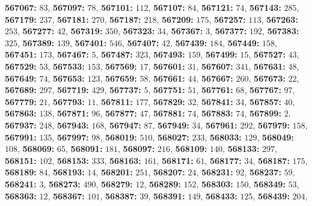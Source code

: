 \textsf{\bfseries 567067:} $83$, \textsf{\bfseries 567097:} $78$, \textsf{\bfseries 567101:} $112$, \textsf{\bfseries 567107:} $84$, \textsf{\bfseries 567121:} $74$, \textsf{\bfseries 567143:} $285$, \textsf{\bfseries 567179:} $237$, \textsf{\bfseries 567181:} $270$, \textsf{\bfseries 567187:} $218$, \textsf{\bfseries 567209:} $175$, \textsf{\bfseries 567257:} $113$, \textsf{\bfseries 567263:} $253$, \textsf{\bfseries 567277:} $42$, \textsf{\bfseries 567319:} $350$, \textsf{\bfseries 567323:} $34$, \textsf{\bfseries 567367:} $3$, \textsf{\bfseries 567377:} $192$, \textsf{\bfseries 567383:} $325$, \textsf{\bfseries 567389:} $139$, \textsf{\bfseries 567401:} $546$, \textsf{\bfseries 567407:} $42$, \textsf{\bfseries 567439:} $184$, \textsf{\bfseries 567449:} $158$, \textsf{\bfseries 567451:} $173$, \textsf{\bfseries 567467:} $5$, \textsf{\bfseries 567487:} $323$, \textsf{\bfseries 567493:} $159$, \textsf{\bfseries 567499:} $15$, \textsf{\bfseries 567527:} $43$, \textsf{\bfseries 567529:} $53$, \textsf{\bfseries 567533:} $153$, \textsf{\bfseries 567569:} $17$, \textsf{\bfseries 567601:} $31$, \textsf{\bfseries 567607:} $341$, \textsf{\bfseries 567631:} $48$, \textsf{\bfseries 567649:} $74$, \textsf{\bfseries 567653:} $123$, \textsf{\bfseries 567659:} $58$, \textsf{\bfseries 567661:} $44$, \textsf{\bfseries 567667:} $260$, \textsf{\bfseries 567673:} $22$, \textsf{\bfseries 567689:} $297$, \textsf{\bfseries 567719:} $429$, \textsf{\bfseries 567737:} $5$, \textsf{\bfseries 567751:} $51$, \textsf{\bfseries 567761:} $68$, \textsf{\bfseries 567767:} $97$, \textsf{\bfseries 567779:} $21$, \textsf{\bfseries 567793:} $11$, \textsf{\bfseries 567811:} $177$, \textsf{\bfseries 567829:} $32$, \textsf{\bfseries 567841:} $34$, \textsf{\bfseries 567857:} $40$, \textsf{\bfseries 567863:} $138$, \textsf{\bfseries 567871:} $96$, \textsf{\bfseries 567877:} $47$, \textsf{\bfseries 567881:} $74$, \textsf{\bfseries 567883:} $74$, \textsf{\bfseries 567899:} $2$, \textsf{\bfseries 567937:} $248$, \textsf{\bfseries 567943:} $168$, \textsf{\bfseries 567947:} $87$, \textsf{\bfseries 567949:} $34$, \textsf{\bfseries 567961:} $292$, \textsf{\bfseries 567979:} $158$, \textsf{\bfseries 567991:} $135$, \textsf{\bfseries 567997:} $98$, \textsf{\bfseries 568019:} $510$, \textsf{\bfseries 568027:} $233$, \textsf{\bfseries 568033:} $129$, \textsf{\bfseries 568049:} $108$, \textsf{\bfseries 568069:} $65$, \textsf{\bfseries 568091:} $181$, \textsf{\bfseries 568097:} $216$, \textsf{\bfseries 568109:} $140$, \textsf{\bfseries 568133:} $297$, \textsf{\bfseries 568151:} $102$, \textsf{\bfseries 568153:} $333$, \textsf{\bfseries 568163:} $161$, \textsf{\bfseries 568171:} $61$, \textsf{\bfseries 568177:} $34$, \textsf{\bfseries 568187:} $175$, \textsf{\bfseries 568189:} $84$, \textsf{\bfseries 568193:} $14$, \textsf{\bfseries 568201:} $251$, \textsf{\bfseries 568207:} $24$, \textsf{\bfseries 568231:} $92$, \textsf{\bfseries 568237:} $59$, \textsf{\bfseries 568241:} $3$, \textsf{\bfseries 568273:} $490$, \textsf{\bfseries 568279:} $12$, \textsf{\bfseries 568289:} $152$, \textsf{\bfseries 568303:} $150$, \textsf{\bfseries 568349:} $53$, \textsf{\bfseries 568363:} $12$, \textsf{\bfseries 568367:} $101$, \textsf{\bfseries 568387:} $39$, \textsf{\bfseries 568391:} $149$, \textsf{\bfseries 568433:} $125$, \textsf{\bfseries 568439:} $204$, 
